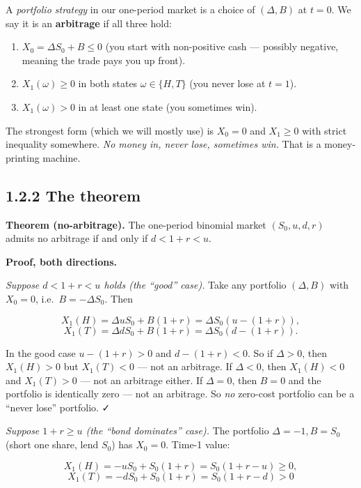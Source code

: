 \documentclass[
  10pt,
  twoside]{book}
\providecommand{\tightlist}{%
  \setlength{\itemsep}{0pt}\setlength{\parskip}{0pt}}
\begin{document}
A \emph{portfolio strategy} in our one-period market is a choice of
\((\Delta,B)\) at \(t=0\). We say it is an \textbf{arbitrage} if all
three hold:

\begin{enumerate}
\def\labelenumi{\arabic{enumi}.}
\tightlist
\item
  \(X_0 = \Delta S_0 + B \le 0\) (you start with non-positive cash ---
  possibly negative, meaning the trade pays you up front).
\item
  \(X_1(\omega) \ge 0\) in both states \(\omega\in\{H,T\}\) (you never
  lose at \(t=1\)).
\item
  \(X_1(\omega) > 0\) in at least one state (you sometimes win).
\end{enumerate}

The strongest form (which we will mostly use) is \(X_0 = 0\) and
\(X_1 \ge 0\) with strict inequality somewhere. \emph{No money in, never
lose, sometimes win.} That is a money-printing machine.

\subsection{1.2.2 The theorem}\label{the-theorem}

\textbf{Theorem (no-arbitrage).} The one-period binomial market
\((S_0,u,d,r)\) admits no arbitrage if and only if \(d<1+r<u\).

\textbf{Proof, both directions.}

\emph{Suppose \(d<1+r<u\) holds (the ``good'' case).} Take any portfolio
\((\Delta,B)\) with \(X_0=0\), i.e.~\(B=-\Delta S_0\). Then

\[X_1(H) = \Delta uS_0 + B(1+r) = \Delta S_0(u - (1+r)),\]
\[X_1(T) = \Delta dS_0 + B(1+r) = \Delta S_0(d - (1+r)).\]

In the good case \(u-(1+r)>0\) and \(d-(1+r)<0\). So if \(\Delta>0\),
then \(X_1(H)>0\) but \(X_1(T)<0\) --- not an arbitrage. If
\(\Delta<0\), then \(X_1(H)<0\) and \(X_1(T)>0\) --- not an arbitrage
either. If \(\Delta=0\), then \(B=0\) and the portfolio is identically
zero --- not an arbitrage. So \emph{no} zero-cost portfolio can be a
``never lose'' portfolio. ✓

\emph{Suppose \(1+r\ge u\) (the ``bond dominates'' case).} The portfolio
\(\Delta=-1, B=S_0\) (short one share, lend \(S_0\)) has \(X_0=0\).
Time-1 value:

\[X_1(H) = -uS_0 + S_0(1+r) = S_0(1+r-u) \ge 0,\]
\[X_1(T) = -dS_0 + S_0(1+r) = S_0(1+r-d) > 0\]
\end{document}
